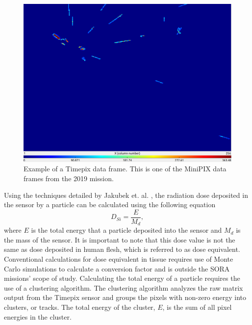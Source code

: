 \begin{figure}[h!]
	\begin{center}
		\includegraphics[width=\textwidth]{figures/interesting-frame-3447.png}
		\caption{Example of a Timepix data frame. This is one of the MiniPIX data frames from the 2019 mission.}
		\label{fig:minipix-example-frame}
	\end{center}
\end{figure}


Using the techniques detailed by Jakubek et. al. \cite{Jakubek-Analysis}, the radiation dose deposited in the sensor by a particle can be calculated using the following equation
\begin{equation*}
  D_{Si} = \dfrac{E}{M_d},
\end{equation*}
where $E$ is the total energy that a particle deposited into the sensor and $M_d$ is the mass of the sensor.
It is important to note that this dose value is not the same as dose deposited in human flesh, which is referred to as dose equivalent.
Conventional calculations for dose equivalent in tissue requires use of Monte Carlo simulations to calculate a conversion factor \cite{Stuart-Thesis} and is outside the SORA missions' scope of study.
Calculating the total energy of a particle requires the use of a clustering algorithm.
The clustering algorithm analyzes the raw matrix output from the Timepix sensor and groups the pixels with non-zero energy into clusters, or tracks.
The total energy of the cluster, $E$, is the sum of all pixel energies in the cluster.

